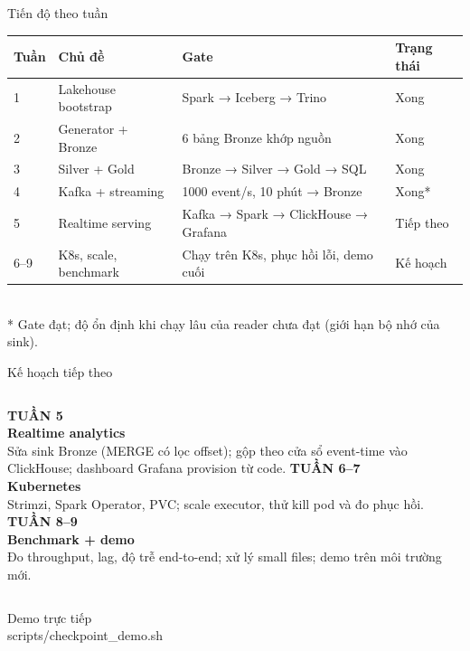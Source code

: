 \documentclass[aspectratio=169,11pt]{beamer}
\begin{document}
\begin{frame}{Tiến độ theo tuần}
  \small
  \begin{tabular}{@{}llp{}l@{}}
    \toprule
    \textbf{Tuần} & \textbf{Chủ đề} & \textbf{Gate} & \textbf{Trạng thái} \\
    \midrule
    1 & Lakehouse bootstrap & Spark → Iceberg → Trino & \alert{Xong} \\
    2 & Generator + Bronze  & 6 bảng Bronze khớp nguồn & \alert{Xong} \\
    3 & Silver + Gold       & Bronze → Silver → Gold → SQL & \alert{Xong} \\
    4 & Kafka + streaming   & 1000 event/s, 10 phút → Bronze & \alert{Xong}* \\
    5 & Realtime serving    & Kafka → Spark → ClickHouse → Grafana & Tiếp theo \\
    6–9 & K8s, scale, benchmark & Chạy trên K8s, phục hồi lỗi, demo cuối & Kế hoạch \\
    \bottomrule
  \end{tabular}\\[6pt]
  {\footnotesize\color{muted} * Gate đạt; độ ổn định khi chạy lâu của reader chưa đạt (giới hạn bộ nhớ của sink).}
\end{frame}

\begin{frame}{Kế hoạch tiếp theo}
  \begin{columns}[T,onlytextwidth]
      {\color{teal}\small\bfseries TUẦN 5}\\[2pt]
      \textbf{Realtime analytics}\\[4pt]
      {\small Sửa sink Bronze (MERGE có lọc offset); gộp theo cửa sổ event-time vào ClickHouse; dashboard Grafana provision từ code.}
      {\color{teal}\small\bfseries TUẦN 6–7}\\[2pt]
      \textbf{Kubernetes}\\[4pt]
      {\small Strimzi, Spark Operator, PVC; scale executor, thử kill pod và đo phục hồi.}
      {\color{teal}\small\bfseries TUẦN 8–9}\\[2pt]
      \textbf{Benchmark + demo}\\[4pt]
      {\small Đo throughput, lag, độ trễ end-to-end; xử lý small files; demo trên môi trường mới.}
  \end{columns}
\end{frame}

\begin{frame}[standout]
  Demo trực tiếp\\[8pt]
  {\normalsize\ttfamily scripts/checkpoint\_demo.sh}
\end{frame}
\end{document}
